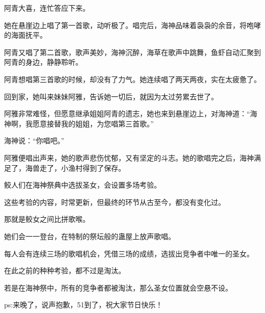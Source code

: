 \begin{this_body}
阿青大喜，连忙答应下来。

她在悬崖边上唱了第一首歌，动听极了。唱完后，海神品味着袅袅的余音，将咆哮的海面抚平。

阿青又唱了第二首歌，歌声美妙，海神沉醉，海草在歌声中跳舞，鱼虾自动汇聚到阿青的身边，静静聆听。

阿青想唱第三首歌的时候，却没有了力气。她连续唱了两天两夜，实在太疲惫了。

回到家，她叫来妹妹阿雅，告诉她一切后，就因为太过劳累去世了。

阿雅非常难怪，但愿意继承姐姐阿青的遗志，她也来到悬崖边上，对海神道：“海神啊，我愿意接替我的姐姐，为您唱第三首歌。”

海神说：“你唱吧。”

阿雅便唱出声来，她的歌声悲伤忧郁，又有坚定的斗志。她的歌唱完之后，海神满足了，海兽走了，小渔村得到了保存。

鲛人们在海神祭典中选拔圣女，会设置多场考验。

这些考验的内容，时常更新，但最终的环节从古至今，都没有变化过。

那就是鲛女之间比拼歌喉。

她们会一一登台，在特制的祭坛般的蛊屋上放声歌唱。

每人会有连续三场的歌唱机会，凭借三场的成绩，选拔出竞争者中唯一的圣女。

在此之前的种种考验，都不过是淘汰。

若是在海神祭中，所有的竞争者都被淘汰，那么圣女位置就会空悬不设。

ps:来晚了，说声抱歉，51到了，祝大家节日快乐！

\end{this_body}

